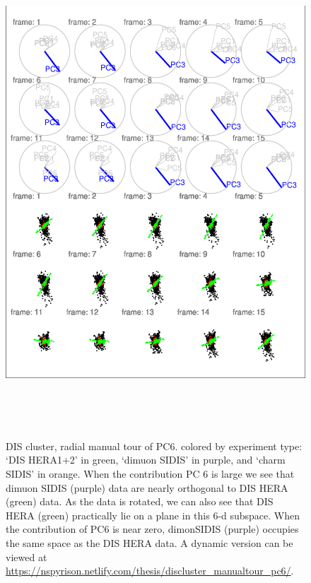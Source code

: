\documentclass{monashthesis}
\begin{document}
\begin{figure}

{\centering \includegraphics[width=6in,height=7.2in]{thesis_files/figure-latex/DISclusterGood-1} 

}

\caption{DIS cluster, radial manual tour of PC6. colored
by experiment type: `DIS HERA1+2' in green, `dimuon SIDIS' in purple,
and `charm SIDIS' in orange. When the contribution PC 6 is large we see
that dimuon SIDIS (purple) data are nearly orthogonal to DIS HERA
(green) data. As the data is rotated, we can also see that DIS HERA
(green) practically lie on a plane in this 6-d subspace. When the
contribution of PC6 is near zero, dimonSIDIS (purple) occupies the same
space as the DIS HERA data. A dynamic version can be viewed at
\url{https://nspyrison.netlify.com/thesis/discluster_manualtour_pc6/}.}\label{fig:DISclusterGood}
\end{figure}
\end{document}
